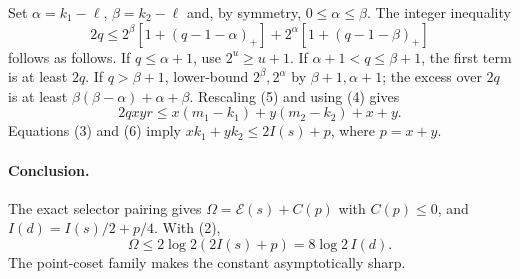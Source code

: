 Set $\alpha=k_1-\ell$, $\beta=k_2-\ell$ and, by symmetry,
$0\le\alpha\le\beta$.  The integer inequality
\[
2q\le2^\beta[1+(q-1-\alpha)_+]
       +2^\alpha[1+(q-1-\beta)_+]                         \tag{5}
\]
follows as follows.  If $q\le\alpha+1$, use
$2^u\ge u+1$.  If $\alpha+1<q\le\beta+1$, the first term is at least
$2q$.  If $q>\beta+1$, lower-bound $2^\beta,2^\alpha$ by
$\beta+1,\alpha+1$; the excess over $2q$ is at least
$\beta(\beta-\alpha)+\alpha+\beta$.  Rescaling (5) and using (4) gives
\[
 2qxyr\le x(m_1-k_1)+y(m_2-k_2)+x+y.                      \tag{6}
\]
Equations (3) and (6) imply
$xk_1+yk_2\le2I(s)+p$, where $p=x+y$.

\paragraph{Conclusion.}
The exact selector pairing gives
$\Omega=\mathcal E(s)+C(p)$ with $C(p)\le0$, and
$I(d)=I(s)/2+p/4$.  With (2),
\[
 \Omega\le2\log2(2I(s)+p)=8\log2\,I(d).
\]
The point-coset family makes the constant asymptotically sharp.
